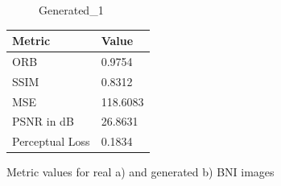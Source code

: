 \documentclass[12pt,DIV14,BCOR12mm,a4paper,footinclude=false,headinclude,parskip=half-,twoside,openright,cleardoublepage=empty,toc=index,bibliography=totoc,listof=totoc]{scrreprt}
\numberwithin{equation}{chapter}
\begin{document}
\begin{figure}
\begin{minipage}[H]{\linewidth}
\begin{minipage}[H]{0.5\linewidth}
\begin{subfigure}[t]{0.48\linewidth}
                \caption{Generated\_1}
            \end{subfigure}
        \end{minipage}%
        \hfill
        \begin{minipage}[H]{0.5\linewidth} %
            \centering
            \small
            \begin{tabular}{p{3cm} p{2cm}}
                \toprule
                \textbf{Metric} & \textbf{Value} \\
                \midrule
                ORB             & 0.9754        \\
                SSIM            & 0.8312        \\
                MSE             & 118.6083      \\
                PSNR in dB      & 26.8631       \\
                Perceptual Loss & 0.1834        \\
                \bottomrule
            \end{tabular}
        \end{minipage}%
        \caption{Metric values for real a) and generated b) BNI images}
        \label{fig:comparison_real_generated_1_1_bni}
    \end{minipage}
\end{figure}
\end{document}
